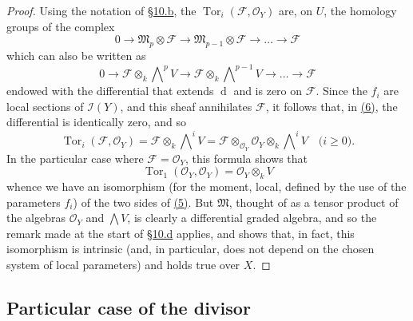 \documentclass{article}
\newcommand{\scr}[1]{{\mathscr{#1}}}
\newcommand{\dd}{\operatorname{d}\!}
\renewcommand{\geq}{\geqslant}
\DeclareMathOperator{\Tor}{Tor}
\begin{document}
\begin{proof}
  Using the notation of \hyperref[subsection10b]{\S10.b}, the $\Tor_i(\scr{F},\scr{O}_Y)$ are, on $U$, the homology groups of the complex
  \[
    0\to\mathfrak{M}_p\otimes\scr{F}\to\mathfrak{M}_{p-1}\otimes\scr{F}\to\ldots\to\scr{F}
  \]
  which can also be written as
  \[
  \label{equation6}
    0 \to \scr{F}\otimes_k\bigwedge\nolimits^p V \to \scr{F}\otimes_k\bigwedge\nolimits^{p-1}V \to \ldots \to \scr{F}
    \tag{6}
  \]
  endowed with the differential that extends $\dd$ and is zero on $\scr{F}$.
  Since the $f_i$ are local sections of $\scr{I}(Y)$, and this sheaf annihilates $\scr{F}$, it follows that, in \hyperref[equation6]{(6)}, the differential is identically zero, and so
  \[
    \Tor_i(\scr{F},\scr{O}_Y) = \scr{F}\otimes_k\bigwedge\nolimits^iV = \scr{F}\otimes_{\scr{O}_Y}\scr{O}_Y\otimes_k\bigwedge\nolimits^i V
    \quad\mbox{($i\geq0$).}
  \]
  In the particular case where $\scr{F}=\scr{O}_Y$, this formula shows that
  \[
    \Tor_1(\scr{O}_Y,\scr{O}_Y) = \scr{O}_Y\otimes_k V
  \]
  whence we have an isomorphism (for the moment, local, defined by the use of the parameters $f_i$) of the two sides of \hyperref[equation5]{(5)}.
  But $\mathfrak{M}$, thought of as a tensor product of the algebras $\scr{O}_Y$ and $\bigwedge V$, is clearly a differential graded algebra, and so the remark made at the start of \hyperref[subsection10d]{\S10.d} applies, and shows that, in fact, this isomorphism is intrinsic (and, in particular, does not depend on the chosen system of local parameters) and holds true over $X$.
\end{proof}


\subsection{Particular case of the divisor}
\label{subsection10e}
\end{document}
